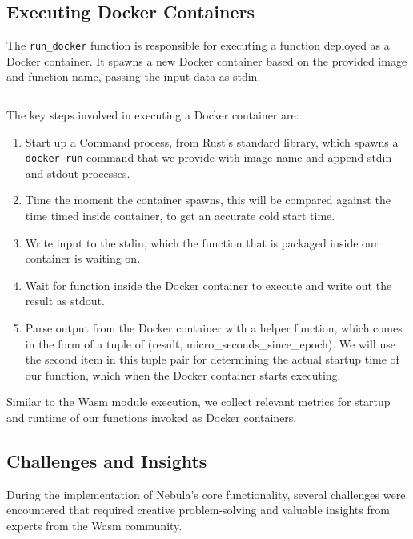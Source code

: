\documentclass[
  table]{report}
\providecommand{\tightlist}{%
  \setlength{\itemsep}{0pt}\setlength{\parskip}{0pt}}
\begin{document}
\subsection{Executing Docker Containers}
\label{sect:execute_docker}

The \texttt{run\_docker} function is responsible for executing a
function deployed as a Docker container. It spawns a new Docker
container based on the provided image and function name, passing the
input data as stdin.

\inputminted{rust}{assets/code/docker_runner.rs}

The key steps involved in executing a Docker container are:

\begin{enumerate}
\def\labelenumi{\arabic{enumi}.}
\tightlist
\item
  Start up a Command process, from Rust's standard library, which spawns
  a \texttt{docker\ run} command that we provide with image name and
  append stdin and stdout processes.
\item
  Time the moment the container spawns, this will be compared against
  the time timed inside container, to get an accurate cold start time.
\item
  Write input to the stdin, which the function that is packaged inside
  our container is waiting on.
\item
  Wait for function inside the Docker container to execute and write out
  the result as stdout.
\item
  Parse output from the Docker container with a helper function, which
  comes in the form of a tuple of (result,
  micro\_seconds\_since\_epoch). We will use the second item in this
  tuple pair for determining the actual startup time of our function,
  which when the Docker container starts executing.
\end{enumerate}

Similar to the \ac{Wasm} module execution, we collect relevant metrics
for startup and runtime of our functions invoked as Docker containers.

\subsection{Challenges and Insights} 
\label{sect:6-challenge_insights}

During the implementation of Nebula's core functionality, several
challenges were encountered that required creative problem-solving and
valuable insights from experts from the \ac{Wasm} community.
\end{document}
